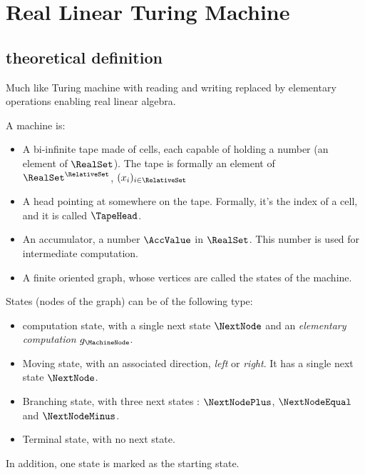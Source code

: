 \section{Real Linear Turing Machine}

\subsection{theoretical definition}
\label{subsec:RLTMdef}
Much like Turing machine with reading and writing replaced by elementary operations enabling real linear algebra.

A machine is:
\begin{itemize}
	\item A bi-infinite tape made of cells, each capable of holding a number (an element of $\RealSet$).
	The tape is formally an element of $\RealSet^{\RelativeSet}$, $(x_i)_{i\in \RelativeSet}$
	\item A head pointing at somewhere on the tape.
	Formally, it's the index of a cell, and it is called $\TapeHead$.
	\item An accumulator, a number $\AccValue$ in $\RealSet$.
	This number is used for intermediate computation.
	\item A finite oriented graph, whose vertices are called the states of the machine.
\end{itemize}

States (nodes of the graph) can be of the following type:

\begin{itemize}
	\item computation state,  with a single next state $\NextNode$ and an \emph{elementary computation} $g_\MachineNode$.
	\item Moving state, with an associated direction, \emph{left} or \emph{right}. It has a single next state $\NextNode$.
	\item Branching state, with three next states : $\NextNodePlus$, $\NextNodeEqual$ and $\NextNodeMinus$.
	\item Terminal state, with no next state.
\end{itemize}
In addition, one state is marked as the starting state.


